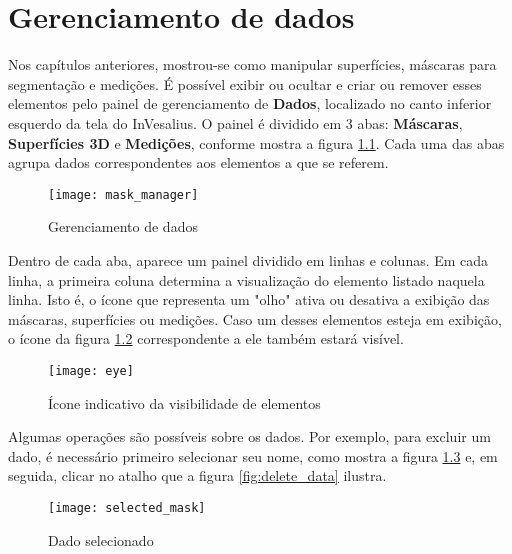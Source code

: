 \chapter{Gerenciamento de dados}

Nos capítulos anteriores, mostrou-se como manipular superfícies, máscaras para segmentação
e medições. É possível exibir ou ocultar e criar ou remover esses elementos pelo painel de
gerenciamento de \textbf{Dados}, localizado no canto inferior esquerdo da tela do InVesalius.
O painel é dividido em 3 abas: \textbf{Máscaras}, \textbf{Superfícies 3D} e \textbf{Medições},
conforme mostra a figura \ref{fig:volumetric_data}. Cada uma das abas agrupa dados
correspondentes aos elementos a que se referem.


\begin{figure}[!htb]
\centering
\texttt{[image: mask\_manager]}
\caption{Gerenciamento de dados}
\label{fig:volumetric_data}
\end{figure}

Dentro de cada aba, aparece um painel dividido em linhas e colunas. Em cada linha, a primeira
coluna determina a visualização do elemento listado naquela linha. Isto é, o ícone que
representa um "olho" ativa ou desativa a exibição das máscaras, superfícies ou medições. Caso
um desses elementos esteja em exibição, o ícone da figura \ref{fig:disable_mask} correspondente
a ele também estará visível.

\newpage

\begin{figure}[!htb]
\centering
\texttt{[image: eye]}
\caption{Ícone indicativo da visibilidade de elementos}
\label{fig:disable_mask}
\end{figure}

Algumas operações são possíveis sobre os dados. Por exemplo, para excluir um dado, é necessário
primeiro selecionar seu nome, como mostra a figura \ref{fig:selected_mask} e, em seguida, clicar
no atalho que a figura \ref{fig:delete_data} ilustra.

\begin{figure}[!htb]
\centering
\texttt{[image: selected\_mask]}
\caption{Dado selecionado}
\label{fig:selected_mask}
\end{figure}


